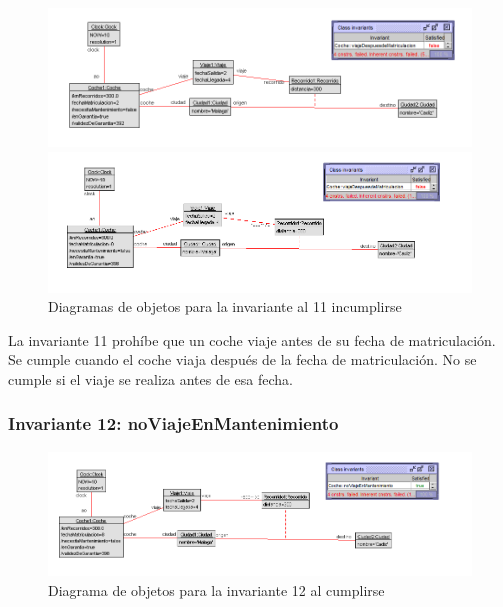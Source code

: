 \documentclass[12pt.a4paper]{article}
\begin{document}
    
 \begin{figure}[H]
    \centering
    \begin{minipage}{0.49\textwidth}
        \centering
        \includegraphics[width=1\linewidth]{Soils/11_v2.png}
    \end{minipage}
    \hfill
    \begin{minipage}{0.49\textwidth}
        \centering
        \includegraphics[width=1\linewidth]{Soils/11_v3.png}
    \end{minipage}
    \caption{Diagramas de objetos para la invariante al 11 incumplirse}
\end{figure}

La invariante 11 prohíbe que un coche viaje antes de su fecha de matriculación. Se cumple cuando el coche viaja después de la fecha de matriculación. No se cumple si el viaje se realiza antes de esa fecha.

\subsubsection{Invariante 12: noViajeEnMantenimiento}

\vspace{1.0 cm}
\begin{figure}[H]
     \includegraphics[width=1\linewidth]{Soils/12.png}
     \caption{Diagrama de objetos para la invariante 12 al cumplirse}
\end{figure}
\end{document}
